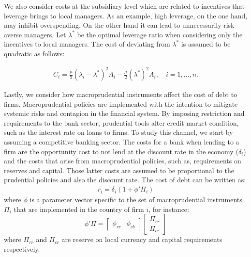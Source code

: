 \documentclass[12pt]{article}
\begin{document}
	We also consider costs at the subsidiary level which are related to incentives that leverage brings to local managers. As an example, high leverage, on the one hand, may inhibit overspending. On the other hand it can lead to unnecessarily risk-averse managers. Let $\lambda^*$ be the optimal leverage ratio when considering only the incentives to local managers. The cost of deviating from $\lambda^*$ is assumed to be quadratic as follows:  
	
	\begin{equation}
	\begin{aligned}
	C_i=\frac{\mu}{2}(\lambda_i-\lambda^*)^2A_i-\frac{\mu}{2}(\lambda^*)^2A_i, \quad i=1,...,n.
	\end{aligned}
	\label{eq:agency cost}
	\end{equation}
	
	Lastly, we consider how macroprudential instruments affect the cost of debt to firms. Macroprudential policies are implemented with the intention to mitigate systemic risks and contagion in the financial system. By imposing restriction and requirements to the bank sector, prudential tools alter credit market condition, such as the interest rate on loans to firms. To study this channel, we start by assuming a competitive banking sector. The costs for a bank when lending to a firm are the opportunity cost to not lend at the discount rate in the economy ($\delta_i$) and the costs that arise from macroprudential policies, such as, requirements on reserves and capital. Those latter costs are assumed to be proportional to the prudential policies and also the discount rate. The cost of debt can be written as:
	\begin{equation}
	\begin{aligned}
	r_i=\delta_i(1+\phi'\Pi_i)
	\end{aligned}
	\label{eq:cost of debt}
	\end{equation}
	where $\phi$ is a parameter vector specific to the set of macroprudential instruments $\Pi_i$ that are implemented in the country of firm $i$, for instance:
	\begin{equation}
	\phi'\Pi=\begin{bmatrix}
	\phi_{rr} &  \phi_{cb}
	\end{bmatrix}
	\begin{bmatrix}
	\Pi_{rr} \\   
	\Pi_{cr} 
	\end{bmatrix}
	\label{eq:phi vector}
	\end{equation}
	where $\Pi_{rr}$ and $\Pi_{cr}$ are reserve on local currency and capital requirements respectively.
\end{document}
